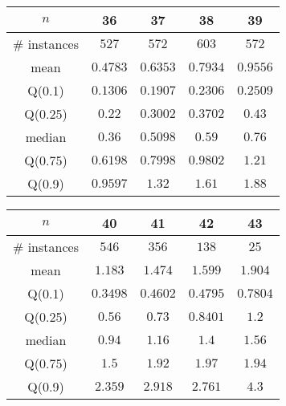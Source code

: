 \begin{tabular}{c|cccc} 
\hline 
$n$ & 36 & 37 & 38 & 39 \tabularnewline 
\hline 
\hline 
\# instances & $527$ & $572$ & $603$ & $572$ \tabularnewline 
mean & $0.4783$ & $0.6353$ & $0.7934$ & $0.9556$ \tabularnewline 
Q(0.1) & $0.1306$ & $0.1907$ & $0.2306$ & $0.2509$ \tabularnewline 
Q(0.25) & $0.22$ & $0.3002$ & $0.3702$ & $0.43$ \tabularnewline 
median & $0.36$ & $0.5098$ & $0.59$ & $0.76$ \tabularnewline 
Q(0.75) & $0.6198$ & $0.7998$ & $0.9802$ & $1.21$ \tabularnewline 
Q(0.9) & $0.9597$ & $1.32$ & $1.61$ & $1.88$ \tabularnewline 
\hline 
\end{tabular} 
\medskip{} 

\begin{tabular}{c|cccc} 
\hline 
$n$ & 40 & 41 & 42 & 43 \tabularnewline 
\hline 
\hline 
\# instances & $546$ & $356$ & $138$ & $25$ \tabularnewline 
mean & $1.183$ & $1.474$ & $1.599$ & $1.904$ \tabularnewline 
Q(0.1) & $0.3498$ & $0.4602$ & $0.4795$ & $0.7804$ \tabularnewline 
Q(0.25) & $0.56$ & $0.73$ & $0.8401$ & $1.2$ \tabularnewline 
median & $0.94$ & $1.16$ & $1.4$ & $1.56$ \tabularnewline 
Q(0.75) & $1.5$ & $1.92$ & $1.97$ & $1.94$ \tabularnewline 
Q(0.9) & $2.359$ & $2.918$ & $2.761$ & $4.3$ \tabularnewline 
\hline 
\end{tabular} 
\medskip{} 

